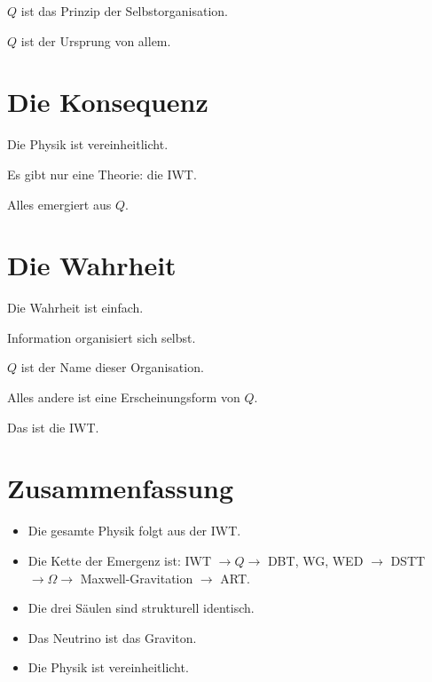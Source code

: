 \( Q \) ist das Prinzip der Selbstorganisation.

\( Q \) ist der Ursprung von allem.

\section{Die Konsequenz}

Die Physik ist vereinheitlicht.

Es gibt nur eine Theorie: die IWT.

Alles emergiert aus \( Q \).

\section{Die Wahrheit}

Die Wahrheit ist einfach.

Information organisiert sich selbst.

\( Q \) ist der Name dieser Organisation.

Alles andere ist eine Erscheinungsform von \( Q \).

Das ist die IWT.

\section{Zusammenfassung}

\begin{itemize}
\item Die gesamte Physik folgt aus der IWT.
\item Die Kette der Emergenz ist: IWT \( \to Q \to \) DBT, WG, WED \( \to \) DSTT \( \to \Omega \to \) Maxwell-Gravitation \( \to \) ART.
\item Die drei Säulen sind strukturell identisch.
\item Das Neutrino ist das Graviton.
\item Die Physik ist vereinheitlicht.
\end{itemize}